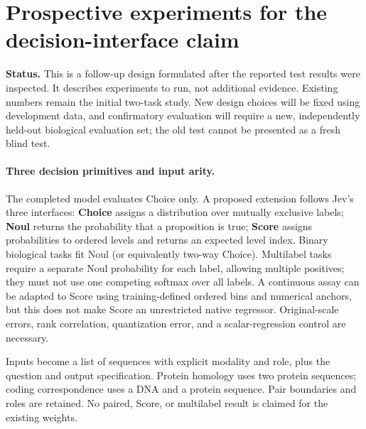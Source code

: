 \section{Prospective experiments for the decision-interface claim}
\label{sec:prospective}
\textbf{Status.} This is a follow-up design formulated after the reported test results were inspected. It describes experiments to run, not additional evidence. Existing numbers remain the initial two-task study. New design choices will be fixed using development data, and confirmatory evaluation will require a new, independently held-out biological evaluation set; the old test cannot be presented as a fresh blind test.

\paragraph{Three decision primitives and input arity.}
The completed model evaluates Choice only. A proposed extension follows Jev's three interfaces: \textbf{Choice} assigns a distribution over mutually exclusive labels; \textbf{Noul} returns the probability that a proposition is true; \textbf{Score} assigns probabilities to ordered levels and returns an expected level index. Binary biological tasks fit Noul (or equivalently two-way Choice). Multilabel tasks require a separate Noul probability for each label, allowing multiple positives; they must not use one competing softmax over all labels. A continuous assay can be adapted to Score using training-defined ordered bins and numerical anchors, but this does not make Score an unrestricted native regressor. Original-scale errors, rank correlation, quantization error, and a scalar-regression control are necessary.

Inputs become a list of sequences with explicit modality and role, plus the question and output specification. Protein homology uses two protein sequences; coding correspondence uses a DNA and a protein sequence. Pair boundaries and roles are retained. No paired, Score, or multilabel result is claimed for the existing weights.

